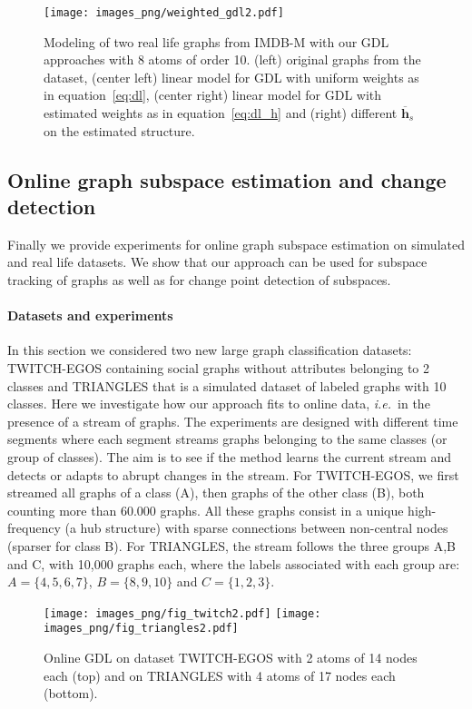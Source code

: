 \documentclass{article}
\def\eqref#1{equation~\ref{#1}}
\def\vh{{\bm{h}}}
\newcommand{\ie}{\textit{i.e.}}
\begin{document}
	\begin{figure}[t]
		\centering
		\texttt{[image: images\_png/weighted\_gdl2.pdf]}\vspace{-1mm}
		\caption{Modeling of two real life graphs from IMDB-M with our GDL
			approaches with 8 atoms of order 10. (left) original graphs 	from the dataset, (center left) linear model for GDL with uniform
			weights as in \eqref{eq:dl}, (center right) linear model for GDL with estimated
			weights  as in \eqref{eq:dl_h} and (right) different $\overline{\vh}_s$ on the
			estimated structure. }  \label{fig:unmix_weights}
	\end{figure}
\subsection{Online graph subspace estimation and change detection}\label{subsec:real2}
	
	Finally we provide experiments for online graph subspace estimation on simulated
	and real life datasets. We show that our approach can be used for subspace
	tracking of graphs as well as for change point detection of subspaces. 
	
	\paragraph{Datasets and experiments} In this section we considered two new large graph
	classification datasets: TWITCH-EGOS \citep{karateclub} containing social graphs without
	attributes belonging to 2 classes and TRIANGLES
	\citep{knyazev2019understanding} that is a simulated dataset of labeled graphs
	with 10 classes. Here we investigate how our approach fits to online data, \ie\ in the presence of a stream of graphs. The experiments are designed with
	different time segments where each segment streams graphs belonging to the same
	classes (or group of classes). The aim is to see if the method learns the current
	stream and detects or adapts to abrupt changes in the stream. For TWITCH-EGOS, we first streamed all graphs of a class (A), then graphs of the
	other class (B), both counting more than 60.000 graphs. All these graphs consist in a unique high-frequency (a hub structure) with sparse connections between non-central nodes (sparser for class B).  For TRIANGLES, the 
	stream follows the three
	groups A,B and C, with 10,000 graphs each, where  the labels  associated with each group are:
	$A=\{4,5,6,7\}$, $B= \{8,9,10\}$ and $C= \{1,2,3\}$.
	
	\begin{figure}[t]
		\centering
		\hspace{-2mm}\texttt{[image: images\_png/fig\_twitch2.pdf]}
\texttt{[image: images\_png/fig\_triangles2.pdf]}\vspace{-4mm}
		\caption{Online GDL on dataset TWITCH-EGOS with 2 atoms of
			14 nodes each (top) and on TRIANGLES with 4 atoms of 17 nodes each (bottom).} \label{fig:online}
	\end{figure}
	
\end{document}
